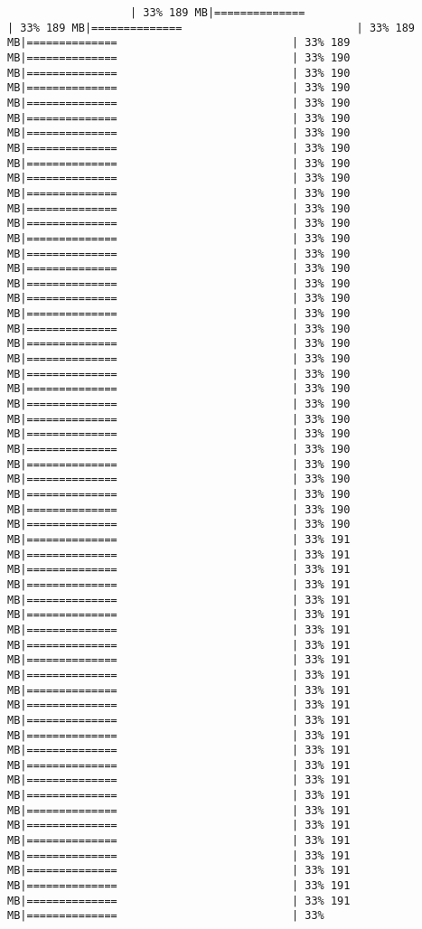 \documentclass[
]{article}
\begin{document}
\begin{verbatim}
                   | 33% 189 MB|==============                           | 33% 189 MB|==============                           | 33% 189 MB|==============                           | 33% 189 MB|==============                           | 33% 190 MB|==============                           | 33% 190 MB|==============                           | 33% 190 MB|==============                           | 33% 190 MB|==============                           | 33% 190 MB|==============                           | 33% 190 MB|==============                           | 33% 190 MB|==============                           | 33% 190 MB|==============                           | 33% 190 MB|==============                           | 33% 190 MB|==============                           | 33% 190 MB|==============                           | 33% 190 MB|==============                           | 33% 190 MB|==============                           | 33% 190 MB|==============                           | 33% 190 MB|==============                           | 33% 190 MB|==============                           | 33% 190 MB|==============                           | 33% 190 MB|==============                           | 33% 190 MB|==============                           | 33% 190 MB|==============                           | 33% 190 MB|==============                           | 33% 190 MB|==============                           | 33% 190 MB|==============                           | 33% 190 MB|==============                           | 33% 190 MB|==============                           | 33% 190 MB|==============                           | 33% 190 MB|==============                           | 33% 190 MB|==============                           | 33% 190 MB|==============                           | 33% 190 MB|==============                           | 33% 190 MB|==============                           | 33% 190 MB|==============                           | 33% 191 MB|==============                           | 33% 191 MB|==============                           | 33% 191 MB|==============                           | 33% 191 MB|==============                           | 33% 191 MB|==============                           | 33% 191 MB|==============                           | 33% 191 MB|==============                           | 33% 191 MB|==============                           | 33% 191 MB|==============                           | 33% 191 MB|==============                           | 33% 191 MB|==============                           | 33% 191 MB|==============                           | 33% 191 MB|==============                           | 33% 191 MB|==============                           | 33% 191 MB|==============                           | 33% 191 MB|==============                           | 33% 191 MB|==============                           | 33% 191 MB|==============                           | 33% 191 MB|==============                           | 33% 191 MB|==============                           | 33% 191 MB|==============                           | 33% 191 MB|==============                           | 33% 191 MB|==============                           | 33% 191 MB|==============                           | 33% 191 MB|==============                           | 33% 
\end{verbatim}
\end{document}
